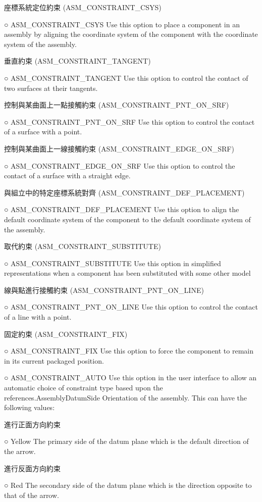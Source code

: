 \documentclass[]{article}
\begin{document}
座標系統定位約束 (ASM\_CONSTRAINT\_CSYS)

○ ASM\_CONSTRAINT\_CSYS Use this option to place a component in an
assembly by aligning the coordinate system of the component with the
coordinate system of the assembly.

垂直約束 (ASM\_CONSTRAINT\_TANGENT)

○ ASM\_CONSTRAINT\_TANGENT Use this option to control the contact of two
surfaces at their tangents.

控制與某曲面上一點接觸約束 (ASM\_CONSTRAINT\_PNT\_ON\_SRF)

○ ASM\_CONSTRAINT\_PNT\_ON\_SRF Use this option to control the contact
of a surface with a point.

控制與某曲面上一線接觸約束 (ASM\_CONSTRAINT\_EDGE\_ON\_SRF)

○ ASM\_CONSTRAINT\_EDGE\_ON\_SRF Use this option to control the contact
of a surface with a straight edge.

與組立中的特定座標系統對齊 (ASM\_CONSTRAINT\_DEF\_PLACEMENT)

○ ASM\_CONSTRAINT\_DEF\_PLACEMENT Use this option to align the default
coordinate system of the component to the default coordinate system of
the assembly.

取代約束 (ASM\_CONSTRAINT\_SUBSTITUTE)

○ ASM\_CONSTRAINT\_SUBSTITUTE Use this option in simplified
representations when a component has been substituted with some other
model

線與點進行接觸約束 (ASM\_CONSTRAINT\_PNT\_ON\_LINE)

○ ASM\_CONSTRAINT\_PNT\_ON\_LINE Use this option to control the contact
of a line with a point.

固定約束 (ASM\_CONSTRAINT\_FIX)

○ ASM\_CONSTRAINT\_FIX Use this option to force the component to remain
in its current packaged position.

○ ASM\_CONSTRAINT\_AUTO Use this option in the user interface to allow
an automatic choice of constraint type based upon the
references.AssemblyDatumSide Orientation of the assembly. This can have
the following values:

進行正面方向約束

○ Yellow The primary side of the datum plane which is the default
direction of the arrow.

進行反面方向約束

○ Red The secondary side of the datum plane which is the direction
opposite to that of the arrow.
\end{document}
